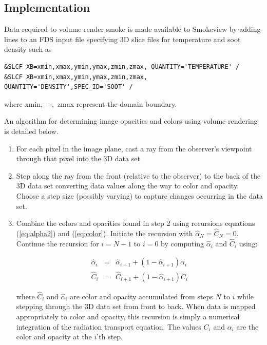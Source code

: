 {\subsection{Implementation}
Data required to volume render smoke is made available to Smokeview by adding lines to an FDS input file specifying 3D slice files for temperature and soot density such as
\begin{verbatim}
&SLCF XB=xmin,xmax,ymin,ymax,zmin,zmax, QUANTITY='TEMPERATURE' /
&SLCF XB=xmin,xmax,ymin,ymax,zmin,zmax, QUANTITY='DENSITY',SPEC_ID='SOOT' /
\end{verbatim}
where xmin,~$\cdots$,~zmax represent the domain boundary.

An algorithm for determining image opacities and colors using volume rendering is detailed below.

\begin{enumerate}

\item For each pixel in the image plane, cast a ray from the observer's viewpoint through that pixel into the 3D data set

\item Step along the ray from the front (relative to the observer) to the back of the 3D data set converting data values along the way to color and opacity.  Choose a step size (possibly varying) to capture changes occurring in the data set.

\item
Combine the colors and opacities found in step 2 using recursions equations (\ref{eq:alpha2}) and (\ref{eq:color}).
Initiate the recursion with $\hat{\alpha}_{N}=\hat{C}_{N}=0$. Continue the recursion for $i=N-1$ to $i=0$ by computing $\hat{\alpha}_i$ and $\hat{C}_i$ using:

\begin{eqnarray*}
\nonumber
\hat{\alpha}_i&=&\hat{\alpha}_{i+1}+\left(1-\hat{\alpha}_{i+1}\right)\alpha_i\\
\hat{C}_i&=&\hat{C}_{i+1}+\left(1-\hat{\alpha}_{i+1}\right)C_i
\end{eqnarray*}

where $\hat{C}_i$ and $\hat{\alpha}_i$ are color and opacity accumulated from steps $N$ to $i$ while stepping through the 3D data set from front to back.  When data is mapped appropriately to color and opacity, this recursion is simply a numerical integration of the radiation transport equation.
The values $C_i$ and $\alpha_i$ are the color and opacity at the $i$'th step.


\end{enumerate}}
